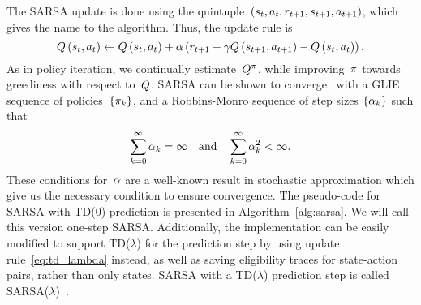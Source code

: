 The SARSA update is done using the quintuple~${\left(s_{t},a_{t},r_{t+1},s_{t+1},a_{t+1}\right)}$, which gives the name to the algorithm. Thus, the update rule is
\begin{equation}
	\estimateactionvalue\left(\randomstate_{\timestep},\randomaction_{\timestep}\right)\gets\estimateactionvalue\left(\randomstate_{\timestep},\randomaction_{\timestep}\right)+\robbinsmonro\left(\randomreward_{\timestep+1}+\discount\estimateactionvalue\left(\randomstate_{\timestep+1},\randomaction_{\timestep+1}\right)-\estimateactionvalue\left(\randomstate_{\timestep},\randomaction_{\timestep}\right)\right).
\end{equation}
As in policy iteration, we continually estimate~${Q^{\pi}}$, while improving~${\pi}$ towards greediness with respect to~${\estimateactionvalue}$. SARSA can be shown to converge~{\cite{singh2000}} with a GLIE sequence of policies~${\left\{\pi_{k}\right\}}$, and a Robbins-Monro sequence of step sizes $\left\{\alpha_{k}\right\}$ such that
\begin{equation} \label{eq:robbins_monro}
	\sum_{k=0}^{\infty}\alpha_{k}=\infty\quad\textnormal{and}\quad\sum_{k=0}^{\infty}\alpha_{k}^{2}<\infty.
\end{equation}
These conditions for~${\alpha}$ are a well-known result in stochastic approximation which give us the necessary condition to ensure convergence. The pseudo-code for SARSA with TD(0) prediction is presented in Algorithm~\ref{alg:sarsa}. We will call this version one-step SARSA. Additionally, the implementation can be easily modified to support TD($\lambda$) for the prediction step by using update rule~\eqref{eq:td_lambda} instead, as well as saving eligibility traces for state-action pairs, rather than only states. SARSA with a TD(${\lambda}$) prediction step is called SARSA(${\lambda}$)~\cite{rummery1994}.

